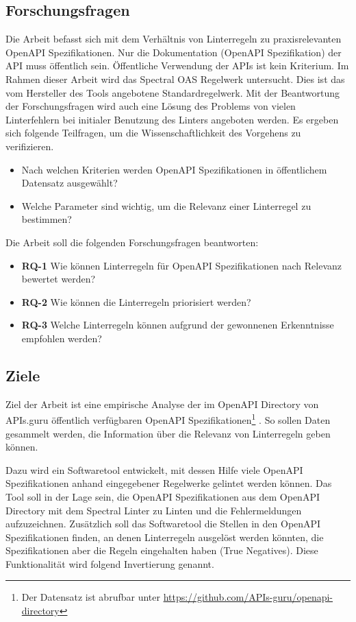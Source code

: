 \subsection{Forschungsfragen} \label{sec:forschungsfragen}
Die Arbeit befasst sich mit dem Verhältnis von Linterregeln zu praxisrelevanten OpenAPI Spezifikationen. Nur die Dokumentation (OpenAPI Spezifikation) der API muss öffentlich sein. Öffentliche Verwendung der APIs ist kein Kriterium. Im Rahmen dieser Arbeit wird das Spectral \acs{OAS} Regelwerk untersucht. Dies ist das vom Hersteller des Tools angebotene Standardregelwerk. Mit der Beantwortung der Forschungsfragen wird auch eine Lösung des Problems von vielen Linterfehlern bei initialer Benutzung des Linters angeboten werden. Es ergeben sich folgende Teilfragen, um die Wissenschaftlichkeit des Vorgehens zu verifizieren.
\begin{itemize}
  \item Nach welchen Kriterien werden OpenAPI Spezifikationen in öffentlichem Datensatz ausgewählt?
  \item Welche Parameter sind wichtig, um die Relevanz einer Linterregel zu bestimmen?
\end{itemize}

Die Arbeit soll die folgenden Forschungsfragen beantworten:

\begin{itemize}
  \item \textbf{RQ-1} Wie können Linterregeln für OpenAPI Spezifikationen nach Relevanz bewertet werden?
  \item \textbf{RQ-2} Wie können die Linterregeln priorisiert werden?
  \item \textbf{RQ-3} Welche Linterregeln können aufgrund der gewonnenen Erkenntnisse empfohlen werden?
\end{itemize}

\subsection{Ziele} \label{sec:ziele}
Ziel der Arbeit ist eine empirische Analyse der im OpenAPI Directory von APIs.guru öffentlich verfügbaren OpenAPI Spezifikationen\footnote{Der Datensatz ist abrufbar unter \href{https://github.com/APIs-guru/openapi-directory}{https://github.com/APIs-guru/openapi-directory}} \parencite{apisguru_openapi_2024}. So sollen Daten gesammelt werden, die Information über die Relevanz von Linterregeln geben können.

Dazu wird ein Softwaretool entwickelt, mit dessen Hilfe viele OpenAPI Spezifikationen anhand eingegebener Regelwerke gelintet werden können. Das Tool soll in der Lage sein, die OpenAPI Spezifikationen aus dem OpenAPI Directory mit dem Spectral Linter zu Linten und die Fehlermeldungen aufzuzeichnen. Zusätzlich soll das Softwaretool die Stellen in den OpenAPI Spezifikationen finden, an denen Linterregeln ausgelöst werden könnten, die Spezifikationen aber die Regeln eingehalten haben (True Negatives). Diese Funktionalität wird folgend Invertierung genannt.

